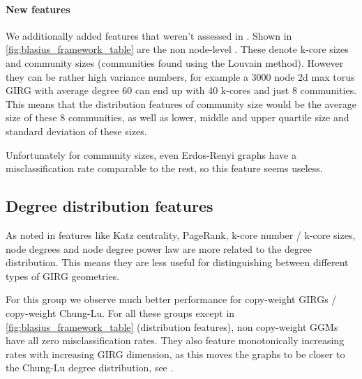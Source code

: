 \paragraph{New features}
We additionally added features that weren't assessed in \cite{blasius2018towards}. Shown in \cref{fig:blasius_framework_table} are the non node-level  . These denote k-core sizes and community sizes (communities found using the Louvain method).
However they can be rather high variance numbers, for example a 3000 node 2d max torus GIRG with average degree 60 can end up with 40 k-cores and just 8 communities. This means that the distribution features of community size would be the average size of these 8 communities, as well as lower, middle and upper quartile size and standard deviation of these sizes.

Unfortunately for community sizes, even Erdos-Renyi graphs have a misclassification rate comparable to the rest, so this feature seems useless.



\subsection{Degree distribution features}
As noted in \cite{blasius2018towards} features like Katz centrality, PageRank, k-core number / k-core sizes, node degrees and node degree power law are more related to the degree distribution. This means they are less useful for distinguishing between different types of GIRG geometries.

For this group we observe much better performance for copy-weight GIRGs / copy-weight Chung-Lu. For all these groups except  in \cref{fig:blasius_framework_table} (distribution features), non copy-weight GGMs have all zero misclassification rates. They also feature monotonically increasing rates with increasing GIRG dimension, as this moves the graphs to be closer to the Chung-Lu degree distribution, see \cite{friedrich2023cliques}.

